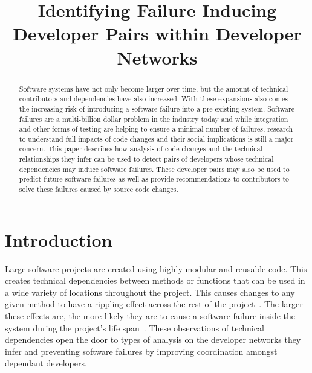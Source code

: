\documentclass[conference]{IEEEtran}
\begin{document}
\title{Identifying Failure Inducing Developer Pairs within Developer Networks}

\author{
}

\maketitle


\begin{abstract}
Software systems have not only become larger over time, but the amount of
technical contributors and dependencies have also increased. With these expansions also comes
the increasing risk of introducing a software failure into a pre-existing system.
Software failures are a multi-billion dollar problem in the industry today and while integration and
other forms of testing are helping to ensure a minimal number of failures, research to understand
full impacts of code changes and their social implications is still a major concern. This paper describes
how analysis of code changes and the technical relationships they infer can be used to detect pairs
of developers whose technical dependencies may induce software failures. These developer pairs may
also be used to predict future software failures as well as provide recommendations to contributors
to solve these failures caused by source code changes.
\end{abstract}


\section{Introduction}

Large software projects are created using highly modular and 
reusable code. This creates technical dependencies between methods or functions
that can be used in a wide variety of locations throughout the project. 
This causes changes to any given method to have a rippling 
effect across the rest of the project~\cite{Acharya:2011:PCI}. The larger these effects are,
the more likely they are to cause a software failure inside the system during the project's
life span~\cite{Zimmermann:2008:PDU}. These observations of technical dependencies open
the door to types of analysis on the developer networks they infer and preventing software
failures by improving coordination amongst dependant developers.
\end{document}
